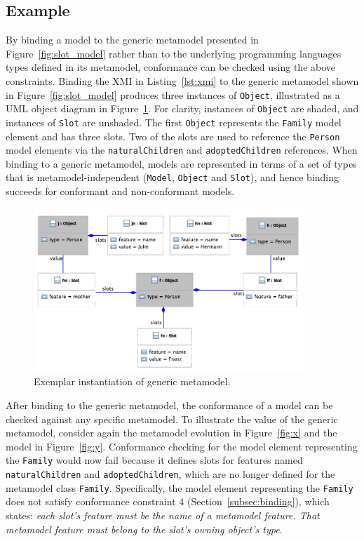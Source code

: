 \subsection{Example}
\label{subsec:mmi_syntax_example}
By binding a model to the generic metamodel presented in Figure~\ref{fig:slot_model} rather than to the underlying programming languages types defined in its metamodel, conformance can be checked using the above constraints. Binding the XMI in Listing~\ref{lst:xmi} to the generic metamodel shown in Figure~\ref{fig:slot_model} produces three instances of \texttt{Ob\-je\-ct}, illustrated as a UML object diagram in Figure~\ref{fig:generic_binding}. For clarity, instances of \texttt{Ob\-je\-ct} are shaded, and instances of \texttt{Sl\-ot} are unshaded. The first \texttt{Ob\-je\-ct} represents the \texttt{Fa\-mi\-ly} model element and has three slots. Two of the slots are used to reference the \texttt{Pe\-rs\-on} model elements via the \texttt{na\-tu\-r\-alCh\-il\-dr\-en} and \texttt{ad\-op\-t\-edCh\-il\-dr\-en} references. When binding to a generic metamodel, models are represented in terms of a set of types that is metamodel-independent (\texttt{Mo\-d\-el}, \texttt{Ob\-je\-ct} and \texttt{Sl\-ot}), and hence binding succeeds for conformant and non-conformant models.

\begin{figure}[htbp]
  \centering
  \includegraphics[width=4in]{5.Implementation/GenericBinding.pdf}
  \caption{Exemplar instantiation of generic metamodel.}
  \label{fig:generic_binding}
\end{figure}

After binding to the generic metamodel, the conformance of a model can be checked against any specific metamodel. To illustrate the value of the generic metamodel, consider again the metamodel evolution in Figure~\ref{fig:x} and the model in Figure~\ref{fig:y}. Conformance checking for the model element representing the \texttt{Fa\-mi\-ly} would now fail because it defines slots for features named  \texttt{na\-tu\-r\-alCh\-il\-dr\-en} and \texttt{ad\-op\-t\-edCh\-il\-dr\-en}, which are no longer defined for the metamodel class \texttt{Fa\-mi\-ly}. Specifically, the model element representing the \texttt{Fa\-mi\-ly} does not satisfy conformance constraint 4 (Section~\ref{subsec:binding}), which states: \emph{each slot's feature must be the name of a metamodel feature. That metamodel feature must belong to the slot's owning object's type}. 

